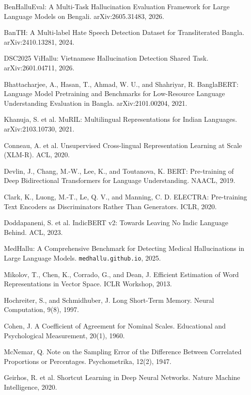 \documentclass[12pt,a4paper]{article}
\begin{document}
\begin{enumerate}[leftmargin=*,itemsep=3pt,label={[\arabic*]}]

\item BenHalluEval: A Multi-Task Hallucination Evaluation Framework for Large
Language Models on Bengali. arXiv:2605.31483, 2026.

\item BanTH: A Multi-label Hate Speech Detection Dataset for Transliterated
Bangla. arXiv:2410.13281, 2024.

\item DSC2025 ViHallu: Vietnamese Hallucination Detection Shared Task.
arXiv:2601.04711, 2026.

\item Bhattacharjee, A., Hasan, T., Ahmad, W. U., and Shahriyar, R. BanglaBERT:
Language Model Pretraining and Benchmarks for Low-Resource Language
Understanding Evaluation in Bangla. arXiv:2101.00204, 2021.

\item Khanuja, S. et al. MuRIL: Multilingual Representations for Indian
Languages. arXiv:2103.10730, 2021.

\item Conneau, A. et al. Unsupervised Cross-lingual Representation Learning at
Scale (XLM-R). ACL, 2020.

\item Devlin, J., Chang, M.-W., Lee, K., and Toutanova, K. BERT: Pre-training of
Deep Bidirectional Transformers for Language Understanding. NAACL, 2019.

\item Clark, K., Luong, M.-T., Le, Q. V., and Manning, C. D. ELECTRA:
Pre-training Text Encoders as Discriminators Rather Than Generators. ICLR, 2020.

\item Doddapaneni, S. et al. IndicBERT v2: Towards Leaving No Indic Language
Behind. ACL, 2023.

\item MedHallu: A Comprehensive Benchmark for Detecting Medical Hallucinations
in Large Language Models. \texttt{medhallu.github.io}, 2025.

\item Mikolov, T., Chen, K., Corrado, G., and Dean, J. Efficient Estimation of
Word Representations in Vector Space. ICLR Workshop, 2013.

\item Hochreiter, S., and Schmidhuber, J. Long Short-Term Memory. Neural
Computation, 9(8), 1997.

\item Cohen, J. A Coefficient of Agreement for Nominal Scales. Educational and
Psychological Measurement, 20(1), 1960.

\item McNemar, Q. Note on the Sampling Error of the Difference Between
Correlated Proportions or Percentages. Psychometrika, 12(2), 1947.

\item Geirhos, R. et al. Shortcut Learning in Deep Neural Networks. Nature
Machine Intelligence, 2020.

\end{enumerate}
\end{document}
